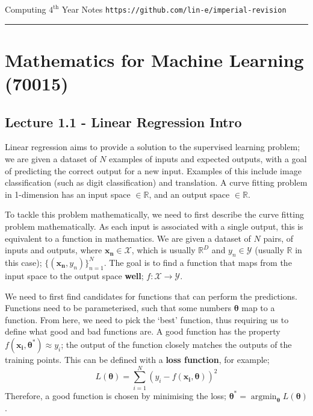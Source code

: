 \documentclass[a4paper, 12pt]{article}
\newcommand{\summation}[2]{\sum\limits_{#1}^{#2}}
\renewcommand{\vec}[1]{\boldsymbol{#1}}
\DeclareMathOperator*{\argmin}{argmin}
\begin{document}
    {\sc Computing $4^\text{th}$ Year Notes} \hfill \texttt{https://github.com/lin-e/imperial-revision}
    \rule{\textwidth}{0.1pt}
    \section*{Mathematics for Machine Learning \hfill (70015)}
        \subsection*{Lecture 1.1 - Linear Regression Intro}
            Linear regression aims to provide a solution to the supervised learning problem; we are given a dataset of $N$ examples of inputs and expected outputs, with a goal of predicting the correct output for a new input.
            Examples of this include image classification (such as digit classification) and translation.
            A curve fitting problem in 1-dimension has an input space $\in \mathbb{R}$, and an output space $\in \mathbb{R}$.
            \medskip

            To tackle this problem mathematically, we need to first describe the curve fitting problem mathematically.
            As each input is associated with a single output, this is equivalent to a function in mathematics.
            We are given a dataset of $N$ pairs, of inputs and outputs, where $\vec{x_n} \in \mathcal{X}$, which is usually $\mathbb{R}^D$ and $y_n \in \mathcal{Y}$ (usually $\mathbb{R}$ in this case); $\{(\vec{x_n}, y_n)\}_{n = 1}^N$.
            The goal is to find a function that maps from the input space to the output space \textbf{well}; $f : \mathcal{X} \to \mathcal{Y}$.
            \medskip

            We need to first find candidates for functions that can perform the predictions.
            Functions need to be parameterised, such that some numbers $\vec{\theta}$ map to a function.
            From here, we need to pick the `best' function, thus requiring us to define what good and bad functions are.
            A good function has the property $f(\vec{x_i}, \vec{\theta^*}) \approx y_i$; the output of the function closely matches the outputs of the training points.
            This can be defined with a \textbf{loss function}, for example;
            $$L(\vec{\theta}) = \summation{i = 1}{N} (y_i - f(\vec{x_i}, \vec{\theta}))^2$$
            Therefore, a good function is chosen by minimising the loss; $\vec{\theta^*} = \argmin_{\vec{\theta}}L(\vec{\theta})$.
\end{document}
